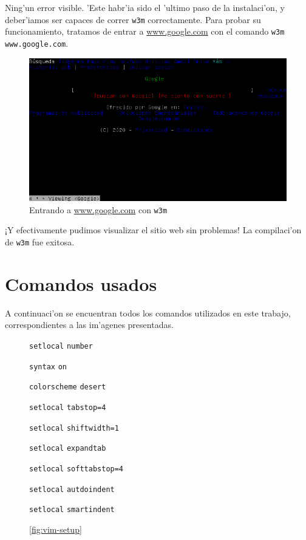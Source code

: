 \documentclass[11pt]{article}
\newcommand{\codetext}[2]{\large\texttt{\textcolor{#1}{#2}}}
\newcommand{\imagecaption}[1]{\vspace{-7pt}\caption*{\char91\ref{fig:#1}\char93}}
\begin{document}
		Ning'un error visible. 'Este habr'ia sido el 'ultimo paso de la instalaci'on, y deber'iamos ser capaces de correr \texttt{w3m} correctamente. Para probar su funcionamiento, tratamos de entrar a \url{www.google.com} con el comando \texttt{w3m www.google.com}.
		
		\begin{figure}[H]
			\centering \captionsetup{justification=centering}
			\includegraphics[width=.8\linewidth]{Images/Compile_w3m/test_w3m}
			\caption{Entrando a \url{www.google.com} con \texttt{w3m}}
			\label{fig:test_w3m}
		\end{figure}
		
		¡Y efectivamente pudimos visualizar el sitio web sin problemas! La compilaci'on de \texttt{w3m} fue exitosa.
		
		
	\section{Comandos usados}
		A continuaci'on se encuentran todos los comandos utilizados en este trabajo, correspondientes a las im'agenes presentadas.
		
		\begin{figure}[H]
			\centering
			\begin{code-box}
				\codetext{light-blue}{setlocal} \codetext{light-red}{number}
				
				\codetext{light-blue}{syntax} \codetext{light-red}{on}

				\codetext{light-blue}{colorscheme} \codetext{light-red}{desert}
				
				\codetext{light-blue}{setlocal} \codetext{light-red}{tabstop=4}

				\codetext{light-blue}{setlocal} \codetext{light-red}{shiftwidth=1}
				
				\codetext{light-blue}{setlocal} \codetext{light-red}{expandtab}
				
				\codetext{light-blue}{setlocal} \codetext{light-red}{softtabstop=4}
				
				\codetext{light-blue}{setlocal} \codetext{light-red}{autdoindent}
				
				\codetext{light-blue}{setlocal} \codetext{light-red}{smartindent}
			\end{code-box}
			\imagecaption{vim-setup}
		\end{figure}
		
\end{document}
